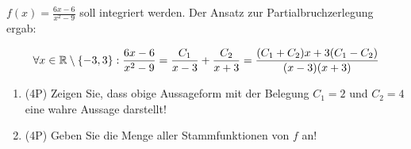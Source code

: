 $f(x)=\frac{6x-6}{x^2-9}$ soll integriert werden. Der Ansatz zur Partialbruchzerlegung ergab:

$$
	\forall x \in \mathbb{R}\setminus\lbrace-3,3\rbrace: \frac{6x-6}{x^2-9} = \frac{C_1}{x-3} + \frac{C_2}{x+3} = \frac{(C_1+C_2)x+3(C_1-C_2)}{(x-3)(x+3)}
$$

\begin{enumerate}[label=(\alph*)]
		\item (4P) Zeigen Sie, dass obige Aussageform mit der Belegung $C_1=2$ und $C_2=4$ eine wahre Aussage darstellt!
			\bigskip
			\bigskip
			\bigskip
			\bigskip
			\bigskip
			\bigskip
			\bigskip
			\bigskip
			\bigskip
			\bigskip
			\bigskip
			\bigskip
			\bigskip
			\bigskip
			\bigskip
			\bigskip
			\bigskip
			\bigskip

		\item (4P) Geben Sie die Menge aller Stammfunktionen von $f$ an!
\end{enumerate}